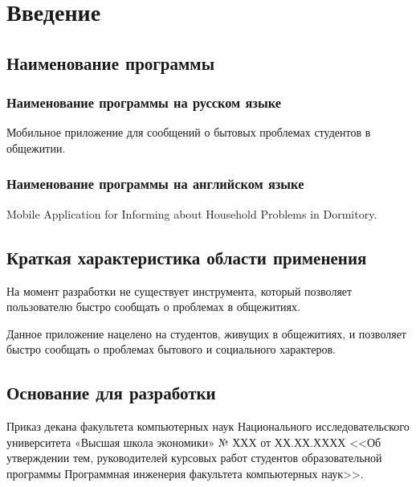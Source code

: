 \section{Введение}

\subsection{Наименование программы}

\subsubsection{Наименование программы на русском языке}

Мобильное приложение для сообщений о бытовых проблемах студентов в общежитии.

\subsubsection{Наименование программы на английском языке}

Mobile Application for Informing about Household Problems in Dormitory.

\subsection{Краткая характеристика области применения}

На момент разработки не существует инструмента, который позволяет пользователю быстро сообщать о проблемах в общежитиях.

Данное приложение нацелено на студентов, живущих в общежитиях, и позволяет быстро сообщать о проблемах бытового и социального характеров.

\subsection{Основание для разработки}

Приказ декана факультета компьютерных наук Национального исследовательского университета «Высшая школа экономики» № ХХХ от ХХ.ХХ.ХХХХ <<Об утверждении тем, руководителей курсовых работ студентов образовательной программы Программная инженерия факультета компьютерных наук>>.
